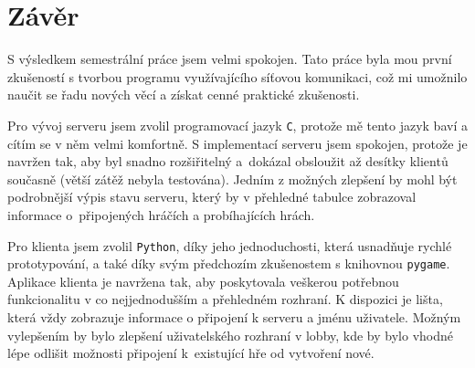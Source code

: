 \documentclass[11pt,a4paper]{article}
\begin{document}
\section{Závěr}
S výsledkem semestrální práce jsem velmi spokojen. Tato práce byla mou první zkušeností s tvorbou programu využívajícího síťovou komunikaci, což mi umožnilo naučit se řadu nových věcí a získat cenné praktické zkušenosti.

Pro vývoj serveru jsem zvolil programovací jazyk \texttt{C}, protože mě tento jazyk baví a cítím se v něm velmi komfortně. S implementací serveru jsem spokojen, protože je navržen tak, aby byl snadno rozšiřitelný a~dokázal obsloužit až desítky klientů současně (větší zátěž nebyla testována). Jedním z možných zlepšení by mohl být podrobnější výpis stavu serveru, který by v přehledné tabulce zobrazoval informace o~připojených hráčích a probíhajících hrách.

Pro klienta jsem zvolil \texttt{Python}, díky jeho jednoduchosti, která usnadňuje rychlé prototypování, a také díky svým předchozím zkušenostem s knihovnou \texttt{pygame}. Aplikace klienta je navržena tak, aby poskytovala veškerou potřebnou funkcionalitu v co nejjednodušším a přehledném rozhraní. K dispozici je lišta, která vždy zobrazuje informace o připojení k serveru a jménu uživatele. Možným vylepšením by bylo zlepšení uživatelského rozhraní v lobby, kde by bylo vhodné lépe odlišit možnosti připojení k~existující hře od vytvoření nové.
\end{document}
